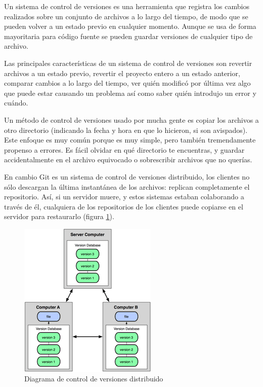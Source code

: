 Un sistema de control de versiones es una herramienta que registra los cambios realizados sobre un conjunto de archivos a lo largo del tiempo, de modo que se pueden volver a un estado previo en cualquier momento. Aunque se usa de forma mayoritaria para código fuente  se pueden guardar versiones de cualquier tipo de archivo.

\bigskip
Las principales características de un sistema de control de versiones son revertir archivos a un estado previo, revertir el proyecto entero a un estado anterior, comparar cambios a lo largo del tiempo, ver quién modificó por última vez algo que puede estar causando un problema así como saber quién introdujo un error y cuándo.

\bigskip
Un método de control de versiones usado por mucha gente es copiar los archivos a otro directorio (indicando la fecha y hora en que lo hicieron, si son avispados). Este enfoque es muy común porque es muy simple, pero también tremendamente propenso a errores. Es fácil olvidar en qué directorio te encuentras, y guardar accidentalmente en el archivo equivocado o sobrescribir archivos que no querías.

\bigskip
En cambio Git es un sistema de control de versiones distribuido, los clientes no sólo descargan la última instantánea de los archivos: replican completamente el repositorio. Así, si un servidor muere, y estos sistemas estaban colaborando a través de él, cualquiera de los repositorios de los clientes puede copiarse en el servidor para restaurarlo (figura \ref{fig:dvcs}).

\begin{figure}[H]
\centering
\includegraphics{../images/dvcs}
\caption{Diagrama de control de versiones distribuido}
\label{fig:dvcs}
\end{figure}

